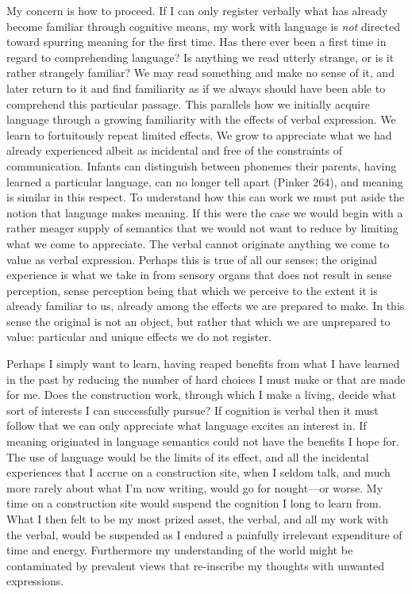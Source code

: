 \documentclass[
]{memoir}
\begin{document}
My concern is how to proceed. If I can only register verbally what has
already become familiar through cognitive means, my work with language
is \emph{not} directed toward spurring meaning for the first time. Has
there ever been a first time in regard to comprehending language? Is
anything we read utterly strange, or is it rather strangely familiar? We
may read something and make no sense of it, and later return to it and
find familiarity as if we always should have been able to comprehend
this particular passage. This parallels how we initially acquire
language through a growing familiarity with the effects of verbal
expression. We learn to fortuitously repeat limited effects. We grow to
appreciate what we had already experienced albeit as incidental and free
of the constraints of communication. Infants can distinguish between
phonemes their parents, having learned a particular language, can no
longer tell apart (Pinker 264), and meaning is similar in this respect.
To understand how this can work we must put aside the notion that
language makes meaning. If this were the case we would begin with a
rather meager supply of semantics that we would not want to reduce by
limiting what we come to appreciate. The verbal cannot originate
anything we come to value as verbal expression. Perhaps this is true of
all our senses; the original experience is what we take in from sensory
organs that does not result in sense perception, sense perception being
that which we perceive to the extent it is already familiar to us,
already among the effects we are prepared to make. In this sense the
original is not an object, but rather that which we are unprepared to
value: particular and unique effects we do not register.

Perhaps I simply want to learn, having reaped benefits from what I have
learned in the past by reducing the number of hard choices I must make
or that are made for me. Does the construction work, through which I
make a living, decide what sort of interests I can successfully pursue?
If cognition is verbal then it must follow that we can only appreciate
what language excites an interest in. If meaning originated in language
semantics could not have the benefits I hope for. The use of language
would be the limits of its effect, and all the incidental experiences
that I accrue on a construction site, when I seldom talk, and much more
rarely about what I'm now writing, would go for nought---or worse. My
time on a construction site would suspend the cognition I long to learn
from. What I then felt to be my most prized asset, the verbal, and all
my work with the verbal, would be suspended as I endured a painfully
irrelevant expenditure of time and energy. Furthermore my understanding
of the world might be contaminated by prevalent views that re-inscribe
my thoughts with unwanted expressions.
\end{document}
